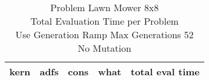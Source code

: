 \begin{table}[H]
\caption{Problem  Lawn Mower 8x8\\Total Evaluation Time per Problem \\ Use Generation Ramp  Max Generations 52\\ No Mutation \\}
\begin{center}
\scalebox{1.0} %
{
\begin{tabular}{llllr}
\hline
kern & adfs & cons & what & total eval time \\
\hline


\end{tabular}
}
\end{center}
\end{table}

